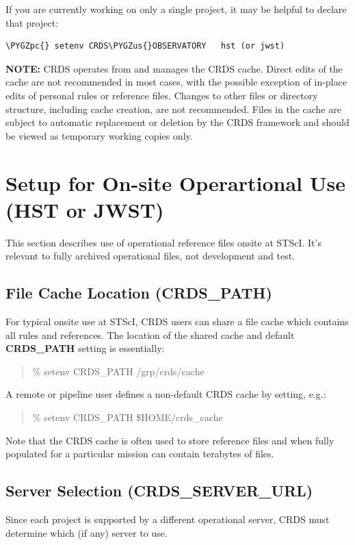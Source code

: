 \documentclass[letterpaper,10pt,english]{sphinxmanual}
\def\PYGZus{\char`\_}
\def\PYGZpc{\char`\%}
\begin{document}
If you are currently working on only a single project,  it may be helpful to declare that project:

\begin{Verbatim}[commandchars=\\\{\}]
\PYGZpc{} setenv CRDS\PYGZus{}OBSERVATORY   hst (or jwst)
\end{Verbatim}

\textbf{NOTE:}  CRDS operates from and manages the CRDS cache.   Direct edits of the cache are not recommended in
most cases,  with the possible exception of in-place edits of personal rules or reference files.   Changes to
other files or directory structure,   including cache creation,  are not recommended.   Files in the cache
are subject to automatic replacement or deletion by the CRDS framework and should be viewed as temporary
working copies only.


\section{Setup for On-site Operartional Use (HST or JWST)}
\label{installation:setup-for-on-site-operartional-use-hst-or-jwst}
This section describes use of operational reference files onsite at STScI.  It's relevant to fully archived
operational files,  not development and test.


\subsection{File Cache Location (CRDS\_PATH)}
\label{installation:file-cache-location-crds-path}
For typical onsite use at STScI, CRDS users can share a file cache which contains all rules and references.  The
location of the shared cache and default \textbf{CRDS\_PATH} setting is essentially:
\begin{quote}

\% setenv CRDS\_PATH  /grp/crds/cache
\end{quote}

A remote or pipeline user defines a non-default CRDS cache by setting, e.g.:
\begin{quote}

\% setenv CRDS\_PATH   \$HOME/crds\_cache
\end{quote}

Note that the CRDS cache is often used to store reference files and when fully populated for a
particular mission can contain terabytes of files.


\subsection{Server Selection (CRDS\_SERVER\_URL)}
\label{installation:server-selection-crds-server-url}
Since each project is supported by a different operational server, CRDS must determine which (if any)
server to use.
\end{document}
